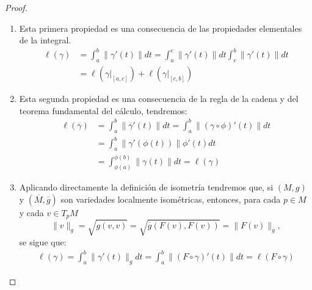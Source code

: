 \begin{proof}\phantom{ }
	\begin{enumerate}
		\item Esta primera propiedad es una consecuencia de las propiedades elementales de la integral.
		      \begin{align*}
			      \ell(\gamma)
			       & = \int_{a}^{b} \|\gamma'(t)\|dt
			      = \int_{a}^{c} \|\gamma'(t)\| dt \int_{c}^{b}\|\gamma'(t)\|dt \\
			       & = \ell(\gamma|_{[a,c]}) + \ell(\gamma|_{[c,b]})
		      \end{align*}
		\item Esta segunda propiedad es una consecuencia de la regla de la cadena y del teorema fundamental del cálculo, tendremos:
		      \begin{align*}
			      \ell(\overline{\gamma})
			       & = \int_{a}^{b} \|\overline{\gamma}'(t)\| dt
			      = \int_{a}^{b} \|(\gamma \circ \phi)'(t) \| dt                \\
			       & = \int_{a}^{b} \|\gamma'(\phi(t))\| \phi'(t) dt            \\
			       & = \int_{\phi(a)}^{\phi(b)} \|\gamma(t)\| dt = \ell(\gamma)
		      \end{align*}
		\item Aplicando directamente la definición de isometría tendremos que, si $(M,g)$ y $(\overline{M}, \overline{g})$ son  variedades localmente isométricas, entonces, para cada $p \in M$ y cada $v \in T_{p}M$
		      \[
			      \|v\|_{g} = \sqrt{g(v,v)}
			      = \sqrt{\overline{g}(F(v),F(v))} = \|F(v)\|_{\overline{g}},
		      \]
		      se sigue que:
		      \begin{align*}
			      \ell(\gamma) = \int_{a}^{b} \|\gamma'(t)\|_g dt
			      = \int_{a}^{b} \|(F \circ \gamma)'(t)\| dt = \ell(F \circ \gamma)
		      \end{align*}
	\end{enumerate}
\end{proof}

